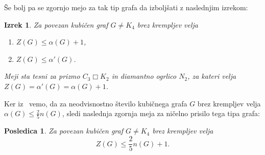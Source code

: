\documentclass[12pt,a4paper,twoside]{article}
\theoremstyle{definition} %
\theoremstyle{plain} %
\newtheorem{izrek}[definicija]{Izrek}
\newtheorem{posledica}[definicija]{Posledica}
\numberwithin{equation}{section}  %
\DeclareMathOperator{\boxempty}{\Box}
\begin{document}
Še bolj pa se zgornjo mejo za tak tip grafa da izboljšati z naslednjim izrekom:
\begin{izrek}{{\cite[izrek 5]{davila2018claw}}}
    Za povezan kubičen graf $G \neq K_4$ brez krempljev velja
    \begin{enumerate}
        \item $Z(G) \leq \alpha(G) + 1$,
        \item $Z(G) \leq \alpha'(G)$.
    \end{enumerate}
    Meji sta tesni za prizmo $C_3 \boxempty K_2$ in diamantno ogrlico $N_2$, za kateri velja $Z(G) = \alpha'(G) = \alpha(G) + 1$.
\end{izrek}

Ker iz~\cite{faudree1992independent} vemo, da za neodvisnostno število kubičnega grafa $G$ brez krempljev velja $\alpha(G) \leq \frac{2}{5} n(G)$, sledi naslednja zgornja meja za ničelno prisilo tega tipa grafa:
\begin{posledica}
    Za povezan kubičen graf $G \neq K_4$ brez krempljev velja
    \[ Z(G) \leq \frac{2}{5} n(G) + 1. \]
\end{posledica}

\cleardoublepage                           %

\newpage

\appendix
\end{document}

